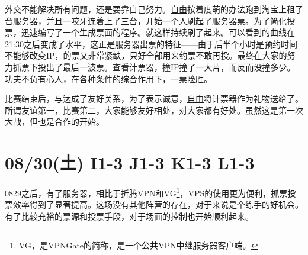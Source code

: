 外交不能解决所有问题，还是要靠自己努力。\uline{自由}按着度萌的办法跑到淘宝上租了台服务器，并且一咬牙连着上了三台，开始一个人刷起了服务器票。为了简化投票，迅速编写了一个生成票面的程序。就这样持续刷了起来。可以看到的曲线在21:30之后变成了水平，这正是服务器出票的特征——由于后半个小时是预约时间不能够改变IP，的票又非常紧缺，只好全部用来约票不敢再投。最终在大家的努力抓票下投出了最后一波票。查看计票器，撞IP撞了一大片，而反而没撞多少。功夫不负有心人，在各种条件的综合作用下，一票险胜。

比赛结束后，与达成了友好关系，为了表示诚意，\uline{自由}将计票器作为礼物送给了。所谓友谊第一，比赛第二，大家能够友好相处，对大家都有好处。虽然这是第一次大战，但也是合作的开始。

\section{08/30(土) I1-3 J1-3 K1-3 L1-3}


0829之后，有了服务器，相比于折腾VPN和VG\footnote{VG，是VPNGate的简称，是一个公共VPN中继服务器客户端。}，VPS的使用更为便利，抓票投票效率得到了显著提高。这场没有其他阵营的存在，对于来说是个练手的好机会。有了比较充裕的票源和投票手段，对于场面的控制也开始顺利起来。

